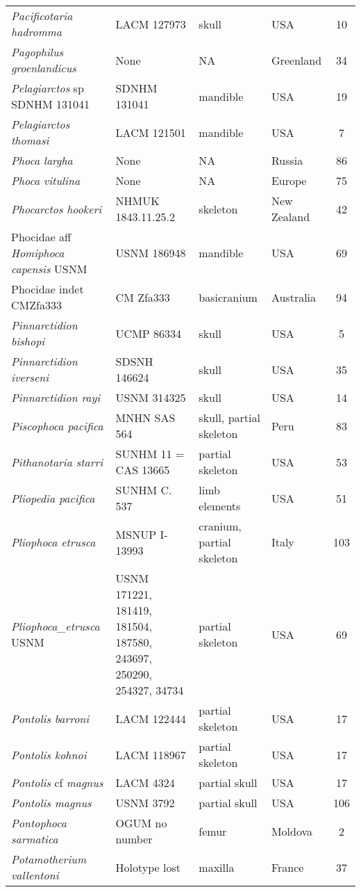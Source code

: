 \begin{longtable}{p{}p{}p{}lc}
\textit{Pacificotaria hadromma} & LACM 127973	& skull	& USA & 10\\
\textit{Pagophilus groenlandicus} &	None & 	NA & 	Greenland & 34\\
\textit{Pelagiarctos} sp SDNHM 131041 &	SDNHM 131041 & 	mandible & 	USA & 19\\
\textit{Pelagiarctos thomasi} &	LACM 121501 & 	mandible & 	USA & 7\\
\textit{Phoca largha} &	None & 	NA & 	Russia	 & 86\\
\textit{Phoca vitulina} &	None & 	NA & 	Europe & 75\\
\textit{Phocarctos hookeri} &	NHMUK 1843.11.25.2 & 	skeleton & 	New Zealand & 42\\
Phocidae aff \textit{Homiphoca capensis} USNM	& USNM 186948	& mandible	& USA & 69\\
Phocidae indet CMZfa333	& CM Zfa333 & 	basicranium & 	Australia & 94\\
\textit{Pinnarctidion bishopi} &	UCMP 86334 & 	skull & 	USA & 5\\
\textit{Pinnarctidion iverseni} &	SDSNH 146624 & 	skull & 	USA & 35\\
\textit{Pinnarctidion rayi} &	USNM 314325 & 	skull & 	USA & 14\\
\textit{Piscophoca pacifica} &	MNHN SAS 564 & 	skull, partial skeleton	 & Peru & 83\\
\textit{Pithanotaria starri} &	SUNHM 11 = CAS 13665 & 	partial skeleton & 	USA & 53\\
\textit{Pliopedia pacifica} &	SUNHM C. 537 & 	limb elements & 	USA & 51\\
\textit{Pliophoca etrusca} &	MSNUP I-13993 & 	cranium, partial skeleton & 	Italy & 103\\
\textit{Pliophoca_etrusca} USNM & USNM 171221, 181419, 181504, 187580, 243697, 250290, 254327, 34734 &	partial skeleton & USA & 69\\
\textit{Pontolis barroni} &	LACM 122444 & 	partial skeleton & 	USA & 17\\
\textit{Pontolis kohnoi} &	LACM 118967 & 	partial skeleton & 	USA & 17\\
\textit{Pontolis} cf \textit{magnus} &	LACM 4324	& partial skull	& USA & 17\\
\textit{Pontolis magnus} &	USNM 3792 & 	partial skull & 	USA & 106\\
\textit{Pontophoca sarmatica} &	OGUM no number	& femur	& Moldova & 2\\
\textit{Potamotherium vallentoni}	 & Holotype lost	& maxilla	& France & 37\\

\end{longtable}
